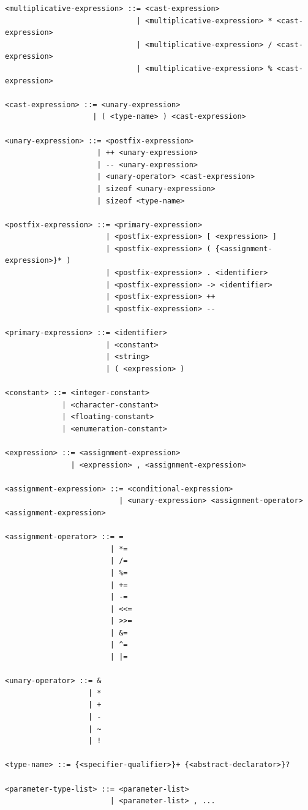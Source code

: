 \documentclass[
	12pt, %
]{fphw}
\begin{document}
\begin{verbatim}
<multiplicative-expression> ::= <cast-expression>
                              | <multiplicative-expression> * <cast-expression>
                              | <multiplicative-expression> / <cast-expression>
                              | <multiplicative-expression> % <cast-expression>

<cast-expression> ::= <unary-expression>
                    | ( <type-name> ) <cast-expression>

<unary-expression> ::= <postfix-expression>
                     | ++ <unary-expression>
                     | -- <unary-expression>
                     | <unary-operator> <cast-expression>
                     | sizeof <unary-expression>
                     | sizeof <type-name>

<postfix-expression> ::= <primary-expression>
                       | <postfix-expression> [ <expression> ]
                       | <postfix-expression> ( {<assignment-expression>}* )
                       | <postfix-expression> . <identifier>
                       | <postfix-expression> -> <identifier>
                       | <postfix-expression> ++
                       | <postfix-expression> --

<primary-expression> ::= <identifier>
                       | <constant>
                       | <string>
                       | ( <expression> )

<constant> ::= <integer-constant>
             | <character-constant>
             | <floating-constant>
             | <enumeration-constant>

<expression> ::= <assignment-expression>
               | <expression> , <assignment-expression>

<assignment-expression> ::= <conditional-expression>
                          | <unary-expression> <assignment-operator> <assignment-expression>

<assignment-operator> ::= =
                        | *=
                        | /=
                        | %=
                        | +=
                        | -=
                        | <<=
                        | >>=
                        | &=
                        | ^=
                        | |=

<unary-operator> ::= &
                   | *
                   | +
                   | -
                   | ~
                   | !

<type-name> ::= {<specifier-qualifier>}+ {<abstract-declarator>}?

<parameter-type-list> ::= <parameter-list>
                        | <parameter-list> , ...


\end{verbatim}
\end{document}
